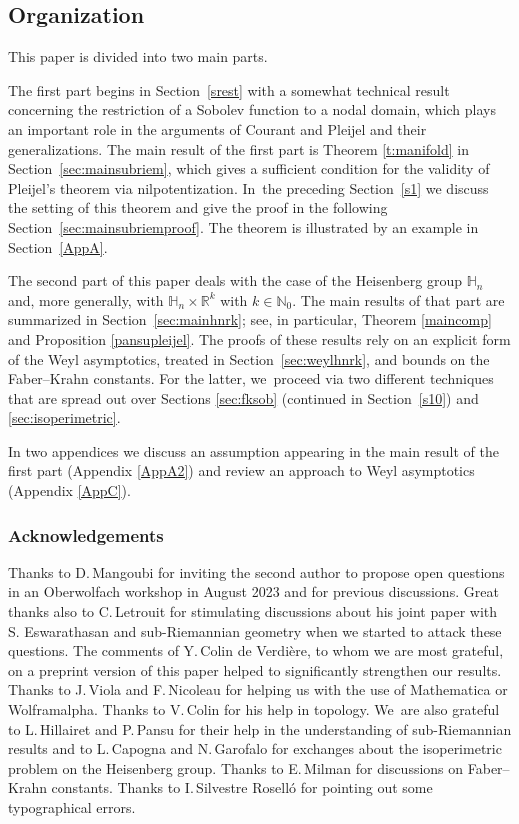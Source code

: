 \documentclass[11pt]{article}
\theoremstyle{definition}
\newcommand{\1}{\mathbbm{1}}
\newcommand{\N}{\mathbb{N}}
\newcommand{\R}{\mathbb{R}}
\numberwithin{equation}{section}
\begin{document}
\subsection{Organization}
This paper is divided into two main parts.

The first part begins in Section~\ref{srest} with a somewhat technical result concerning the restriction of a Sobolev function to a nodal domain, which plays an important role in the arguments of Courant and Pleijel and their generalizations. The main result of the first part is Theorem \ref{t:manifold} in Section~\ref{sec:mainsubriem}, which gives a sufficient condition for the validity of Pleijel's theorem via nilpotentization. In~the preceding Section~\ref{s1} we discuss the setting of this theorem and give the proof in the following Section~\ref{sec:mainsubriemproof}. The theorem is illustrated by an example in Section~\ref{AppA}.

The second part of this paper deals with the case of the Heisenberg group $\mathbb H_n$ and, more generally, with $\mathbb H_n\times\R^k$ with $k\in\N_0$. The main results of that part are summarized in Section~\ref{sec:mainhnrk}; see, in particular, Theorem \ref{maincomp} and Proposition \ref{pansupleijel}. The proofs of these results rely on an explicit form of the Weyl asymptotics, treated in Section~\ref{sec:weylhnrk}, and bounds on the Faber--Krahn constants. For the latter, we~proceed via two different techniques that are spread out over Sections \ref{sec:fksob} (continued in Section~\ref{s10}) and \ref{sec:isoperimetric}.

In two appendices we discuss an assumption appearing in the main result of the first part (Appendix \ref{AppA2}) and review an approach to Weyl asymptotics (Appendix \ref{AppC}).

\subsubsection*{Acknowledgements}
Thanks to D.\,Mangoubi for inviting the second author to propose open questions in an Oberwolfach workshop in August 2023 and for previous discussions. Great thanks also to C.\,Letrouit for stimulating discussions about his joint paper with S. Eswarathasan and sub-Riemannian geometry when we started to attack these questions. The comments of Y.\,Colin de Verdière, to whom we are most grateful, on a preprint version \cite{FrHe1} of this paper helped to significantly strengthen our results. Thanks to J.\,Viola and F.\,Nicoleau for helping us with the use of Mathematica or Wolframalpha. Thanks to V.\,Colin for his help in topology. We~are also grateful to L.\,Hillairet and P.\,Pansu for their help in the understanding of sub-Riemannian results and to L.\,Capogna and N.\,Garofalo for exchanges about the isoperimetric problem on the Heisenberg group. Thanks to E.\,Milman for discussions on Faber--Krahn constants. Thanks to I.\,Silvestre Roselló for pointing out some typographical errors.
\end{document}

